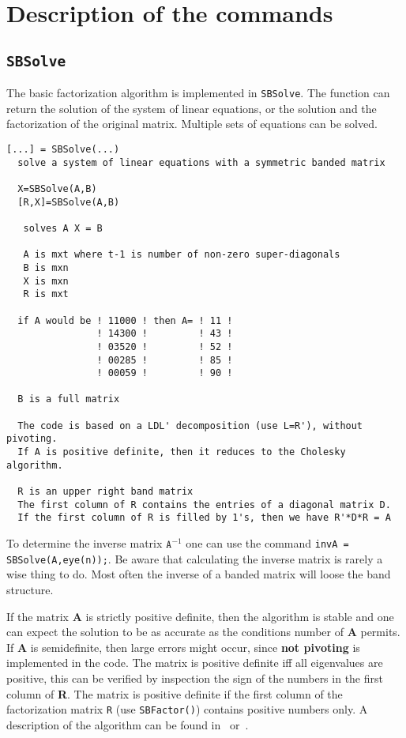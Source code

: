 \documentclass[11pt]{article}
\begin{document}
\section{Description of the commands}
 
\subsection{\texttt{SBSolve}}
The basic factorization algorithm is implemented in \texttt{SBSolve}. The
function can return the solution of the system of linear equations, or the
solution and the factorization of the original matrix.
Multiple sets of equations can be solved.

\begin{verbatim}
[...] = SBSolve(...)
  solve a system of linear equations with a symmetric banded matrix

  X=SBSolve(A,B)
  [R,X]=SBSolve(A,B)

   solves A X = B

   A is mxt where t-1 is number of non-zero super-diagonals
   B is mxn
   X is mxn
   R is mxt

  if A would be ! 11000 ! then A= ! 11 ! 
                ! 14300 !         ! 43 ! 
                ! 03520 !         ! 52 ! 
                ! 00285 !         ! 85 ! 
                ! 00059 !         ! 90 ! 

  B is a full matrix

  The code is based on a LDL' decomposition (use L=R'), without pivoting.
  If A is positive definite, then it reduces to the Cholesky algorithm.

  R is an upper right band matrix
  The first column of R contains the entries of a diagonal matrix D. 
  If the first column of R is filled by 1's, then we have R'*D*R = A
\end{verbatim}

To determine the inverse matrix $\mathtt{A}^{-1}$ one can
use the command \texttt{invA = SBSolve(A,eye(n));}.  Be aware that calculating
the inverse matrix is rarely a wise thing to do. Most often the inverse of a
banded matrix will loose the band structure.

If the matrix \textbf{A} is strictly positive definite, then the algorithm is
stable and one can expect the solution to be as accurate as the conditions
number of \textbf{A} permits. If \textbf{A} is semidefinite, then large errors
might occur, since \textbf{not pivoting} is implemented in the code. The
matrix is positive definite iff all eigenvalues are positive, this can be
verified by inspection the sign of the numbers in the first column of
\textbf{R}.  The matrix is positive definite if the first column of the
factorization matrix \texttt{R} (use \texttt{SBFactor()}) contains positive
numbers only. A description of the algorithm can be found
in~\cite{GoluVanLoan96} or~\cite{VarFem}.
\end{document}
